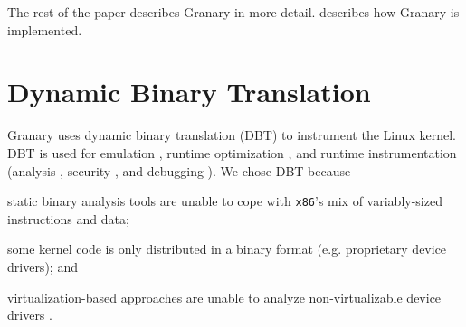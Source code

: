 \documentclass[preprint]{sigplanconf}
\begin{document}

The rest of the paper describes Granary in more detail.  describes how Granary is implemented. 


\section{Dynamic Binary Translation}\label{sec:dbt}

Granary uses dynamic binary translation (DBT) to instrument the Linux kernel. DBT is used for emulation \cite{QEMU}, runtime optimization \cite{DynamoRIOOptimisation}, and runtime instrumentation (analysis \cite{DynamoRIO, DRK, btkernel, ProfilingSimics}, security \cite{Vx32,NaCl,ProgramShepherding}, and debugging \cite{Valgrind}). We chose DBT because \begin{inparaenum}[i)]
	\item static binary analysis tools are unable to cope with \texttt{x86}'s mix of variably-sized instructions and data; 
	\item some kernel code is only distributed in a binary format (e.g. proprietary device drivers); and
	\item virtualization-based approaches are unable to analyze non-virtualizable device drivers \cite{DRK}.
\end{inparaenum}
\end{document}
